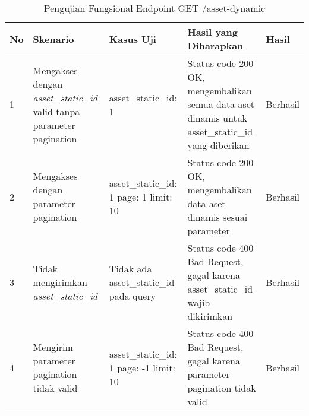 \begin{table}[H]
    \centering
    \begin{tabular}{|p{0.5cm}|p{3cm}|p{5cm}|p{5cm}|p{1.5cm}|}
        \hline
        \rowcolor[HTML]{DAE8FC} 
        \textbf{No} & \textbf{Skenario} & \textbf{Kasus Uji} & \textbf{Hasil yang Diharapkan} & \textbf{Hasil} \\ \hline
        1 & Mengakses dengan \textit{asset\_static\_id} valid tanpa parameter pagination & 
        asset\_static\_id: 1 & 
        Status code 200 OK, mengembalikan semua data aset dinamis untuk asset\_static\_id yang diberikan & 
        Berhasil \\ \hline
        2 & Mengakses dengan parameter pagination & 
        asset\_static\_id: 1 \newline page: 1 \newline limit: 10 & 
        Status code 200 OK, mengembalikan data aset dinamis sesuai parameter & 
        Berhasil \\ \hline
        3 & Tidak mengirimkan \textit{asset\_static\_id} & 
        Tidak ada asset\_static\_id pada query & 
        Status code 400 Bad Request, gagal karena asset\_static\_id wajib dikirimkan & 
        Berhasil \\ \hline
        4 & Mengirim parameter pagination tidak valid & 
        asset\_static\_id: 1 \newline page: -1 \newline limit: 10 & 
        Status code 400 Bad Request, gagal karena parameter pagination tidak valid & 
        Berhasil \\ \hline
    \end{tabular}
    \caption{Pengujian Fungsional Endpoint GET /asset-dynamic}
    \label{tab:asset_dynamic_getall_testing}
\end{table}
